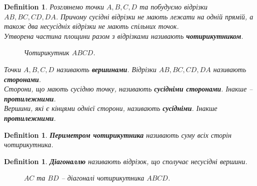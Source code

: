 \documentclass[a4paper, 10pt]{article}
\theoremstyle{theoremdd}
\theoremstyle{theoremdd}
\theoremstyle{theoremdd}
\newtheorem{definition}[theorem]{Definition}
\theoremstyle{theoremdd}
\theoremstyle{theoremdd}
\theoremstyle{theoremdd}
\theoremstyle{theoremdd}
\theoremstyle{theoremdd}
\theoremstyle{theoremdd}
\begin{document}
\begin{definition}
Розглянемо точки $A,B,C,D$ та побудуємо відрізки $AB,BC,CD,DA$. Причому сусідні відрізки не мають лежати на одній прямій, а також два несусідніх відрізки не мають спільних точок.\\
Утворена частина площини разом з відрізками називають \textbf{чотирикутником}.
\begin{figure}[H]
\centering
{}
\caption*{Чотирикутник $ABCD$.}
\end{figure}
Точки $A,B,C,D$ називають \textbf{вершинами}. Відрізки $AB,BC,CD,DA$ називають \textbf{сторонами}.\\
Сторони, що мають сусідню точку, називають \textbf{сусідніми сторонами}. Інакше -- \textbf{протилежними}.\\
Вершини, які є кінцями однієї сторони, називають \textbf{сусідніми}. Інакше \textbf{протилежними}.
\end{definition}

\begin{definition}
\textbf{Периметром чотирикутника} називають суму всіх сторін чотирикутника.
\end{definition}

\begin{definition}
\textbf{Діагоналлю} називають відрізок, що сполучає несусідні вершини.
\begin{figure}[H]
\centering
{}
\caption*{$AC$ та $BD$ -- діагоналі чотирикутника $ABCD$.}
\end{figure}
\end{definition}
\end{document}
